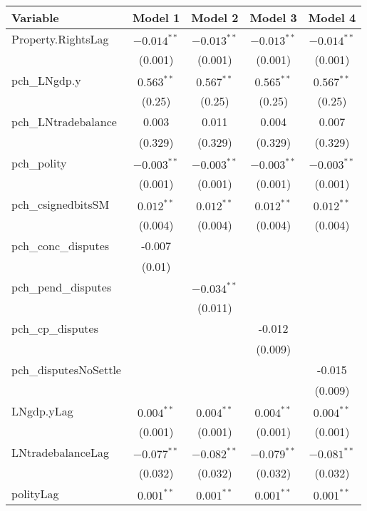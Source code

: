 \begin{table}[ht]
\centering
\begin{tabular}{lcccc}
 Variable & Model 1 & Model 2 & Model 3 & Model 4 \\ 
  \hline
\hline
Property.RightsLag & $-0.014^{\ast\ast}$ & $-0.013^{\ast\ast}$ & $-0.013^{\ast\ast}$ & $-0.014^{\ast\ast}$ \\ 
   & (0.001) & (0.001) & (0.001) & (0.001) \\ 
   \hline
pch\_LNgdp.y & $0.563^{\ast\ast}$ & $0.567^{\ast\ast}$ & $0.565^{\ast\ast}$ & $0.567^{\ast\ast}$ \\ 
   & (0.25) & (0.25) & (0.25) & (0.25) \\ 
  pch\_LNtradebalance & 0.003 & 0.011 & 0.004 & 0.007 \\ 
   & (0.329) & (0.329) & (0.329) & (0.329) \\ 
  pch\_polity & $-0.003^{\ast\ast}$ & $-0.003^{\ast\ast}$ & $-0.003^{\ast\ast}$ & $-0.003^{\ast\ast}$ \\ 
   & (0.001) & (0.001) & (0.001) & (0.001) \\ 
  pch\_csignedbitsSM & $0.012^{\ast\ast}$ & $0.012^{\ast\ast}$ & $0.012^{\ast\ast}$ & $0.012^{\ast\ast}$ \\ 
   & (0.004) & (0.004) & (0.004) & (0.004) \\ 
  pch\_conc\_disputes & -0.007 &  &  &  \\ 
   & (0.01) &  &  &  \\ 
  pch\_pend\_disputes &  & $-0.034^{\ast\ast}$ &  &  \\ 
   &  & (0.011) &  &  \\ 
  pch\_cp\_disputes &  &  & -0.012 &  \\ 
   &  &  & (0.009) &  \\ 
  pch\_disputesNoSettle &  &  &  & -0.015 \\ 
   &  &  &  & (0.009) \\ 
   \hline
LNgdp.yLag & $0.004^{\ast\ast}$ & $0.004^{\ast\ast}$ & $0.004^{\ast\ast}$ & $0.004^{\ast\ast}$ \\ 
   & (0.001) & (0.001) & (0.001) & (0.001) \\ 
  LNtradebalanceLag & $-0.077^{\ast\ast}$ & $-0.082^{\ast\ast}$ & $-0.079^{\ast\ast}$ & $-0.081^{\ast\ast}$ \\ 
   & (0.032) & (0.032) & (0.032) & (0.032) \\ 
  polityLag & $0.001^{\ast\ast}$ & $0.001^{\ast\ast}$ & $0.001^{\ast\ast}$ & $0.001^{\ast\ast}$ \\ 

\end{tabular}
\end{table}
